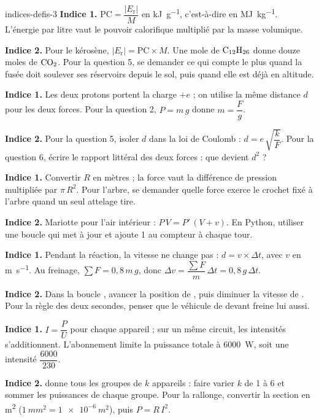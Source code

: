 \begin{blocEdition}{indices-defis-3}
\textbf{Indice 1.} $\mathrm{PC}=\dfrac{|E_\mathrm{r}|}{M}$ en \unit{kJ.g^{-1}}, c'est-à-dire en \unit{MJ.kg^{-1}}. L'énergie par litre vaut le pouvoir calorifique multiplié par la
masse volumique.\par\smallskip
\textbf{Indice 2.} Pour le kérosène, $|E_\mathrm{r}|=\mathrm{PC}\times M$. Une mole de $\ce{C12H26}$ donne douze moles de $\ce{CO2}$. Pour la question 5, se demander
ce qui compte le plus quand la fusée doit soulever ses réservoirs depuis le sol, puis quand elle est déjà en altitude.\par\smallskip
{}
\textbf{Indice 1.} Les deux protons portent la charge $+e$ ; on utilise la même distance $d$ pour les deux forces. Pour la question 2,
$P=m\,g$ donne $m=\dfrac{F}{g}$.\par\smallskip
\textbf{Indice 2.} Pour la question 5, isoler $d$ dans la loi de Coulomb : $d=e\,\sqrt{\dfrac{k}{F}}$. Pour la question 6, écrire le rapport
littéral des deux forces : que devient $d^2$ ?\par\smallskip
{}
\textbf{Indice 1.} Convertir $R$ en mètres ; la force vaut la différence de pression multipliée par $\pi\,R^2$. Pour l'arbre, se demander quelle
force exerce le crochet fixé à l'arbre quand un seul attelage tire.\par\smallskip
\textbf{Indice 2.} Mariotte pour l'air intérieur : $P\,V=P'\,(V+v)$. En Python, utiliser une boucle  qui met à jour  et
ajoute 1 au compteur à chaque tour.\par\smallskip
{}
\textbf{Indice 1.} Pendant la réaction, la vitesse ne change pas : $d=v\times\Delta t$, avec $v$ en \unit{m.s^{-1}}. Au freinage,
$\sum F=0{,}8\,m\,g$, donc $\Delta v=\dfrac{\sum F}{m}\,\Delta t=0{,}8\,g\,\Delta t$.\par\smallskip
\textbf{Indice 2.} Dans la boucle , avancer la position de , puis diminuer la vitesse de . Pour la règle des
deux secondes, penser que le véhicule de devant freine lui aussi.\par\smallskip
{}
\textbf{Indice 1.} $I=\dfrac{P}{U}$ pour chaque appareil ; sur un même circuit, les intensités s'additionnent. L'abonnement limite la puissance
totale à \qty{6000}{W}, soit une intensité $\dfrac{6000}{230}$.\par\smallskip
\textbf{Indice 2.}  donne tous les groupes de $k$ appareils : faire varier $k$ de 1 à 6 et sommer les
puissances de chaque groupe. Pour la rallonge, convertir la section en \unit{m^2} ($\qty{1}{mm^2}=\qty{1e-6}{m^2}$), puis $P=R\,I^2$.\par\smallskip
\end{blocEdition}

